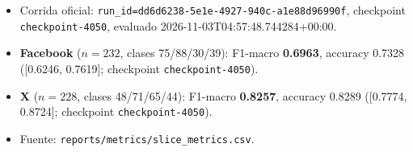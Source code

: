 \begin{itemize}[leftmargin=*]
  \item Corrida oficial: \texttt{run\_id=dd6d6238-5e1e-4927-940c-a1e88d96990f}, checkpoint \texttt{checkpoint-4050}, evaluado 2026-11-03T04:57:48.744284+00:00.
  \item \textbf{Facebook} ($n=232$, clases 75/88/30/39): F1-macro \textbf{0.6963}, accuracy 0.7328 ([0.6246, 0.7619]; checkpoint \texttt{checkpoint-4050}).
  \item \textbf{X} ($n=228$, clases 48/71/65/44): F1-macro \textbf{0.8257}, accuracy 0.8289 ([0.7774, 0.8724]; checkpoint \texttt{checkpoint-4050}).
  \item Fuente: \texttt{reports/metrics/slice\_metrics.csv}.
\end{itemize}
